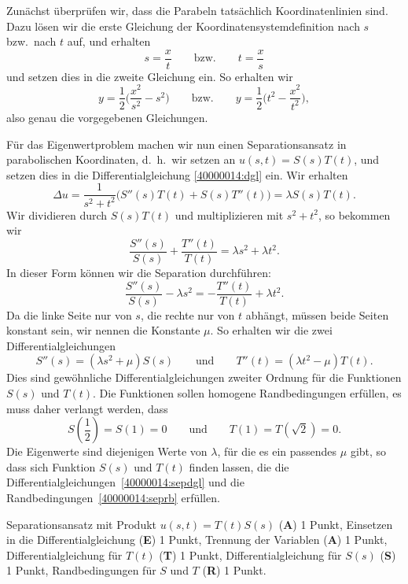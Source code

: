 \begin{loesung}
Zunächst überprüfen wir, dass die Parabeln tatsächlich Koordinatenlinien
sind.
Dazu lösen wir die erste Gleichung der Koordinatensystemdefinition nach $s$
bzw.~nach $t$ auf, und erhalten
\[
s=\frac{x}{t}
\qquad\text{bzw.}\qquad
t=\frac{x}{s}
\]
und setzen dies in die zweite Gleichung ein. 
So erhalten wir
\[
y=\frac12\biggl(\frac{x^2}{s^2}-s^2\biggr)
\qquad\text{bzw.}\qquad
y=\frac12\biggl(t^2 - \frac{x^2}{t^2}\biggr),
\]
also genau die vorgegebenen Gleichungen.

Für das Eigenwertproblem machen wir nun einen Separationsansatz in 
parabolischen Koordinaten, d.~h.~wir setzen an $u(s,t)=S(s)T(t)$, und
setzen dies in die Differentialgleichung \eqref{40000014:dgl} ein.
Wir erhalten
\[
\Delta u
=
\frac1{s^2+t^2}\bigl(S''(s)T(t) + S(s)T''(t)\bigr) = \lambda S(s)T(t).
\]
Wir dividieren durch $S(s)T(t)$ und multiplizieren mit $s^2+t^2$, so
bekommen wir
\[
\frac{S''(s)}{S(s)} + \frac{T''(t)}{T(t)}=\lambda s^2 + \lambda t^2.
\]
In dieser Form können wir die Separation durchführen:
\[
\frac{S''(s)}{S(s)} - \lambda s^2 = - \frac{T''(t)}{T(t)} + \lambda t^2.
\]
Da die linke Seite nur von $s$, die rechte nur von $t$ abhängt, müssen
beide Seiten konstant sein, wir nennen die Konstante $\mu$.
So erhalten wir die zwei Differentialgleichungen
\begin{equation}
S''(s)=(\lambda s^2+\mu)S(s)
\qquad\text{und}\qquad
T''(t) = (\lambda t^2-\mu)T(t).
\label{40000014:sepdgl}
\end{equation}
Dies sind gewöhnliche Differentialgleichungen zweiter Ordnung für die
Funktionen $S(s)$ und $T(t)$.
Die Funktionen sollen homogene Randbedingungen erfüllen, es muss daher
verlangt werden, dass
\begin{equation}
S({\textstyle \frac12})=S(1)=0
\qquad\text{und}\qquad
T(1)=T(\sqrt{2})=0.
\label{40000014:seprb}
\end{equation}
Die Eigenwerte sind diejenigen Werte von $\lambda$, für die es ein passendes
$\mu$ gibt, so dass sich Funktion $S(s)$ und $T(t)$ finden lassen, die
die Differentialgleichungen~\eqref{40000014:sepdgl} und die
Randbedingungen~\eqref{40000014:seprb} erfüllen.
\end{loesung}

\begin{bewertung}
Separationsansatz mit Produkt $u(s,t) = T(t)S(s)$ ({\bf A}) 1 Punkt,
Einsetzen in die Differentialgleichung ({\bf E}) 1 Punkt,
Trennung der Variablen ({\bf A}) 1 Punkt,
Differentialgleichung für $T(t)$ ({\bf T}) 1 Punkt,
Differentialgleichung für $S(s)$ ({\bf S}) 1 Punkt,
Randbedingungen für $S$ und $T$ ({\bf R}) 1 Punkt.
\end{bewertung}



